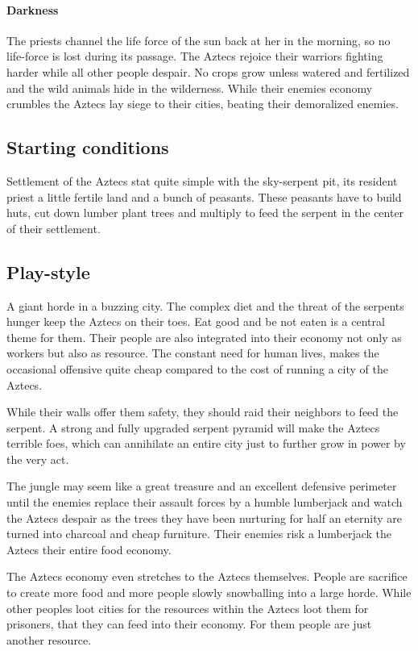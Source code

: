 \documentclass[a4paper]{book}
\begin{document}
			\paragraph{Darkness}
				The priests channel the life force of the sun back at her in the morning,
				so no life-force is lost during its passage.
				The \gls{Aztecs} rejoice their warriors fighting harder while all other people
				despair.
				No crops grow unless watered and fertilized and the wild animals hide in the wilderness.
				While their enemies economy crumbles the \gls{Aztecs} lay siege to their cities,
				beating their demoralized enemies.

	\subsection{Starting conditions}
		Settlement of the \gls{Aztecs} stat quite simple with the sky-serpent pit,
		its resident priest a little fertile land and a bunch of peasants.
		These peasants have to build huts, cut down lumber plant trees and multiply
		to feed the serpent in the center of their settlement.

	\subsection{Play-style}
		A giant horde in a buzzing city.
		The complex diet and the threat of the serpents hunger keep the \gls{Aztecs} on their toes.
		Eat good and be not eaten is a central theme for them.
		Their people are also integrated into their economy not only as workers but also as resource.
		The constant need for human lives, makes the occasional offensive quite cheap
		compared to the cost of running a city of the \gls{Aztecs}.

		While their walls offer them safety, they should raid their neighbors to feed the serpent.
		A strong and fully upgraded serpent pyramid will make the \gls{Aztecs} terrible foes,
		which can annihilate an entire city just to further grow in power by the very act.

		The jungle may seem like a great treasure and an excellent defensive perimeter
		until the enemies replace their assault forces by a humble lumberjack
		and watch the \gls{Aztecs} despair as the trees they have been nurturing for half an eternity
		are turned into charcoal and cheap furniture.
		Their enemies risk a lumberjack the \gls{Aztecs} their entire food economy.

		The \gls{Aztecs} economy even stretches to the \gls{Aztecs} themselves.
		People are sacrifice to create more food and more people slowly snowballing into a large horde.
		While other peoples loot cities for the resources within the \gls{Aztecs} loot them
		for prisoners, that they can feed into their economy.
		For them people are just another resource.
\end{document}
